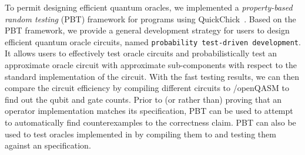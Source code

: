 To permit designing efficient quantum oracles, we implemented a \emph{property-based random testing} (PBT) framework for
\oqasm programs using QuickChick~\cite{quickchick}.
Based on the PBT framework, we provide a general development strategy for users to design efficient quantum oracle circuits, named \texttt{probability test-driven development}.
It allows users to effectively test oracle circuits
and probabilistically test an approximate oracle circuit with approximate sub-components with respect to the standard implementation of the circuit. 
With the fast testing results, we can then compare the circuit efficiency by compiling different circuits to \sqir/openQASM to find out the qubit and gate counts.
Prior to (or rather than) proving that an operator implementation matches its
specification, PBT can be used to attempt to automatically find
counterexamples to the correctness claim. PBT can also be used to test
oracles implemented in \vqimp by compiling them to \oqasm and testing
them against an \oqasm specification.


